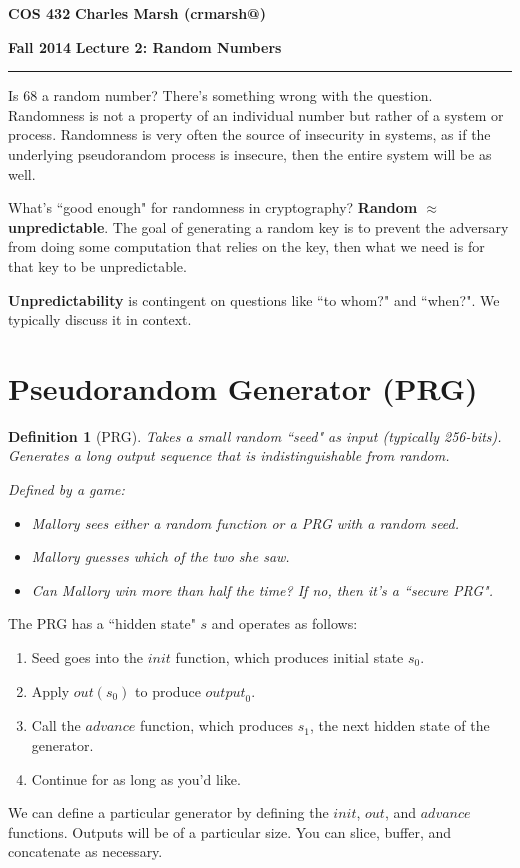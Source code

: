 \documentclass[12pt]{article}
\makeatletter
\newtheorem*{mydef}{Definition}
\newcommand{\myheader}[4]
{\vspace*{-0.5in}
\noindent
{#1} \hfill {#3}

\noindent
{#2} \hfill {#4}

\noindent
\rule[8pt]{\textwidth}{1pt}

\vspace{1ex} 
}  %
\newcommand{\myalgsheader}[0]
{\myheader
{ {\bf{COS 432}} }
{ {\bf{Fall 2014}} }
{ {\bf{Charles Marsh (crmarsh@)}} }
{ {\bf{Lecture 2: Random Numbers}} }
}
\makeatother
\begin{document}
\myalgsheader

\pagestyle{plain}

Is 68 a random number? There's something wrong with the question. Randomness is not a property of an individual number but rather of a system or process. Randomness is very often the source of insecurity in systems, as if the underlying pseudorandom process is insecure, then the entire system will be as well.

What's ``good enough" for randomness in cryptography? \textbf{Random $\approx$ unpredictable}. The goal of generating a random key is to prevent the adversary from doing some computation that relies on the key, then what we need is for that key to be unpredictable.

\textbf{Unpredictability} is contingent on questions like ``to whom?" and ``when?". We typically discuss it in context.

\section*{Pseudorandom Generator (PRG)}

\begin{mydef}[PRG]
Takes a small random ``seed" as input (typically 256-bits). Generates a long output sequence that is indistinguishable from random.

Defined by a game:
\begin{itemize}
\item Mallory sees either a random function or a PRG with a random seed.
\item Mallory guesses which of the two she saw.
\item Can Mallory win more than half the time? If no, then it's a ``secure PRG".
\end{itemize}
\end{mydef}

The PRG has a ``hidden state" $s$ and operates as follows:
\begin{enumerate}
\item Seed goes into the $init$ function, which produces initial state $s_0$.
\item Apply $out(s_0)$ to produce ${output}_0$.
\item Call the $advance$ function, which produces $s_1$, the next hidden state of the generator.
\item Continue for as long as you'd like.
\end{enumerate}

We can define a particular generator by defining the $init$, $out$, and $advance$ functions. Outputs will be of a particular size. You can slice, buffer, and concatenate as necessary.
\end{document}
